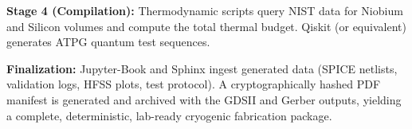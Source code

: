 \documentclass[11pt, a4paper]{article}
\begin{document}
\textbf{Stage 4 (Compilation):} Thermodynamic scripts query NIST data for Niobium and Silicon volumes and compute the total thermal budget. Qiskit (or equivalent) generates ATPG quantum test sequences.

\textbf{Finalization:} Jupyter-Book and Sphinx ingest generated data (SPICE netlists, validation logs, HFSS plots, test protocol). A cryptographically hashed PDF manifest is generated and archived with the GDSII and Gerber outputs, yielding a complete, deterministic, lab-ready cryogenic fabrication package.
\end{document}
